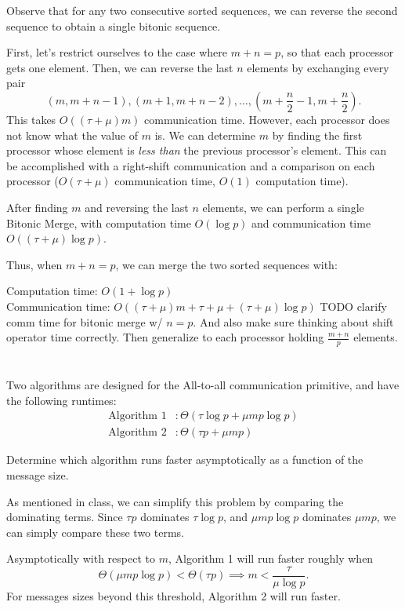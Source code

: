 \documentclass{article}
\begin{document}
\quad Observe that for any two consecutive sorted sequences, we can reverse the second sequence to obtain a single bitonic sequence.

First, let's restrict ourselves to the case where $m + n = p$, so that each processor gets one element.
Then, we can reverse the last $n$ elements by exchanging every pair
$$\left(m, m + n - 1\right), \left(m + 1, m + n - 2\right), \dots, \left(m +\frac{n}{2} - 1, m + \frac{n}{2}\right).$$
This takes $O((\tau + \mu)m)$ communication time.
However, each processor does not know what the value of $m$ is.
We can determine $m$ by finding the first processor whose element is \textit{less than} the previous processor's element.
This can be accomplished with a right-shift communication and a comparison on each processor ($O(\tau + \mu)$ communication time, $O(1)$ computation time).

After finding $m$ and reversing the last $n$ elements, we can perform a single Bitonic Merge, with computation time $O(\log{p})$ and communication time $O((\tau + \mu)\log{p})$.

Thus, when $m + n = p$, we can merge the two sorted sequences with:

Computation time: $O(1 + \log{p})$\\
Communication time: $O((\tau + \mu)m + \tau + \mu + (\tau + \mu)\log{p})$ TODO clarify comm time for bitonic merge w/ $n = p$. And also make sure thinking about shift operator time correctly. Then generalize to each processor holding $\frac{m+n}{p}$ elements.

\section{}
Two algorithms are designed for the All-to-all communication primitive, and have
the following runtimes:
\begin{align*}
  \text{Algorithm 1} &:\Theta\left(\tau\log{p} + \mu m p \log{p}\right)\\
  \text{Algorithm 2} &:\Theta\left(\tau p + \mu m p\right)
\end{align*}

Determine which algorithm runs faster asymptotically as a function of the message size.

\quad As mentioned in class, we can simplify this problem by comparing the dominating terms.
Since $\tau p$ dominates $\tau \log{p}$, and $\mu m p \log{p}$ dominates $\mu m p$, we can simply compare these two terms.

Asymptotically with respect to $m$, Algorithm 1 will run faster roughly when
$$\Theta(\mu mp \log{p}) < \Theta(\tau p) \implies m < \dfrac{\tau}{\mu\log{p}}.$$
For messages sizes beyond this threshold, Algorithm 2 will run faster.
\end{document}

